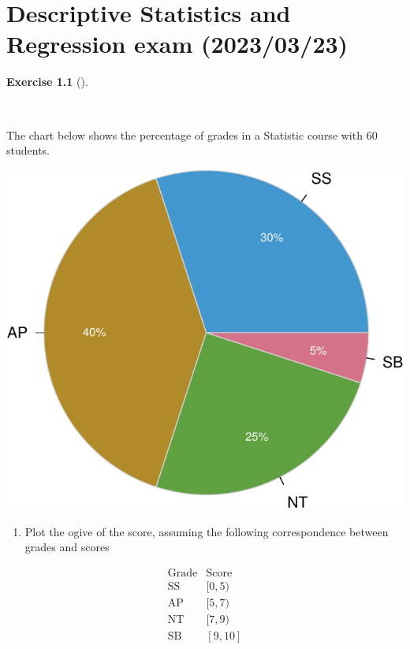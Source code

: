 \documentclass[
  a4paper,
]{scrreport}
\providecommand{\tightlist}{%
  \setlength{\itemsep}{0pt}\setlength{\parskip}{0pt}}\usepackage{longtable,booktabs,array}
\theoremstyle{definition}
\newtheorem{exercise}{Exercise}[chapter]
\theoremstyle{remark}
\begin{document}

\hypertarget{descriptive-statistics-and-regression-exam-20230323}{%
\chapter{Descriptive Statistics and Regression exam
(2023/03/23)}\label{descriptive-statistics-and-regression-exam-20230323}}

\leavevmode{}%
\begin{exercise}[]\label{exr-1}

~

The chart below shows the percentage of grades in a Statistic course
with 60 students.

\includegraphics{./img/exam-2023-03-23/pie-chart-scores-1.pdf}

\begin{enumerate}
\def\labelenumi{\alph{enumi}.}
\tightlist
\item
  Plot the ogive of the score, assuming the following correspondence
  between grades and scores
\end{enumerate}

\[
\begin{array}{lc}
  \mbox{Grade} & \mbox{Score}\\
  \mbox{SS} & [0, 5)\\
  \mbox{AP} & [5, 7)\\
  \mbox{NT} & [7,9)\\
  \mbox{SB} & [9,10]
\end{array}
\]


\end{exercise}
\end{document}
